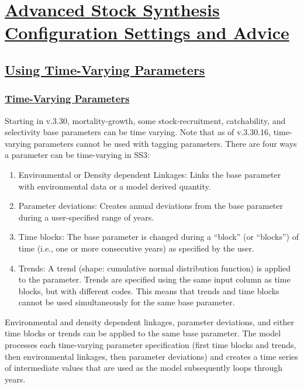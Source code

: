 \hypertarget{AdvancedSettings}{}
\section[Advanced Stock Synthesis Configuration Settings and Advice]{\protect\hyperlink{AdvancedSettings}{Advanced Stock Synthesis Configuration Settings and Advice}}

\hypertarget{TVpara}{}
\subsection[Using Time-Varying Parameters]{\protect\hyperlink{TVpara}{Using Time-Varying Parameters}}

\hypertarget{tvOrder}{}
\subsubsection[Time-Varying Parameters]{\protect\hyperlink{tvOrder}{Time-Varying Parameters}}

Starting in v.3.30, mortality-growth, some stock-recruitment, catchability, and selectivity base parameters can be time varying. Note that as of v.3.30.16, time-varying parameters cannot be used with tagging parameters. There are four ways a parameter can be time-varying in SS3:
\begin{enumerate}
    \item Environmental or Density dependent Linkages: Links the base parameter with environmental data or a model derived quantity.
	\item Parameter deviations: Creates annual deviations from the base parameter during a user-specified range of years.
	\item Time blocks: The base parameter is changed during a ``block'' (or ``blocks'') of time (i.e., one or more consecutive years) as specified by the user.
	\item Trends: A trend (shape: cumulative normal distribution function) is applied to the parameter. Trends are specified using the same input column as time blocks, but with different codes. This means that trends and time blocks cannot be used simultaneously for the same base parameter.
\end{enumerate}

Environmental and density dependent linkages, parameter deviations, and either time blocks or trends can be applied to the same base parameter. The model processes each time-varying parameter specification (first time blocks and trends, then environmental linkages, then parameter deviations) and creates a time series of intermediate values that are used as the model subsequently loops through years.

